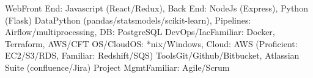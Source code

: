 \begin{additionals}
  \addional
    {Web}{Front End: Javascript (React/Redux), Back End: NodeJs (Express), Python (Flask)}
  \addional
    {Data}{Python (pandas/statsmodels/scikit-learn), Pipelines: Airflow/multiprocessing, DB: PostgreSQL}
  \addional
    {DevOps/Iac}{Familiar: Docker, Terraform, AWS/CFT}
  \addional
    {OS/Cloud}{OS: *nix/Windows, Cloud: AWS (Proficient: EC2/S3/RDS, Familiar: Redshift/SQS)}
  \addional
    {Tools}{Git/Github/Bitbucket, Atlassian Suite (confluence/Jira)}
  \addional
    {Project Mgmt}{Familiar: Agile/Scrum}
\end{additionals}


